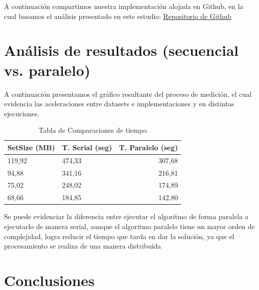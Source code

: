 \documentclass[fleqn,10pt]{SelfArx} %
\begin{document}
A continuación compartimos nuestra implementación alojada en Github, en la cual basamos el análisis presentado en este estudio: \href{https://github.com/jonyzp/HPC}{Repositorio de Github}

\section{Análisis de resultados (secuencial vs. paralelo)}

A continuación presentamos el gráfico resultante del proceso de medición, el cual evidencia las aceleraciones entre datasets e implementaciones y en distintas ejecuciones.

\begin{table}[hbt]
	\caption{Tabla de Comparaciones de tiempo}
	\centering
	\begin{tabular}{llr}
		\cmidrule(r){1-3}
		SetSize (MB) & T. Serial (seg) & T. Paralelo (seg)\\
		\midrule
		
		119,92 & 474,33 & 307,68 \\
		
		94,88 & 341,16 & 216,81 \\
		
		75,02 & 248,02 & 174,89 \\
		
		68,66 & 184,85 & 142,80 \\
		
		\bottomrule
	\end{tabular}
	\label{tab:label}
\end{table}


Se puede evidenciar la diferencia entre ejecutar el algoritmo de forma paralela a ejecutarlo de manera serial, aunque el algoritmo paralelo tiene un mayor orden de complejidad, logra reducir el tiempo que tarda en dar la solución, ya que el procesamiento se realiza de una manera distribuída




\section*{Conclusiones} %
\end{document}
